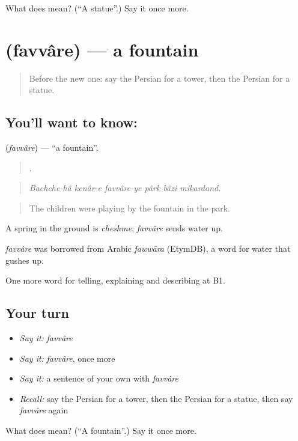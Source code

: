 \begin{tcolorbox}[breakable,colback=teal!4,colframe=teal!35!black,title={Before you move on}]
What does  mean? (\textquotedblleft{}A statue\textquotedblright{}.) Say it once more.
\end{tcolorbox}
\section[\texorpdfstring{\fa{فواره} (favvâre)}{فواره (favvâre)}]{ (favvâre) — a fountain}

\label{lesson:FA-C450-favvare}



\begin{quote}
Before the new one: say the Persian for a tower, then the Persian for a statue.
\end{quote}

\subsection*{You'll want to know: }
\textbf{} (\emph{favvâre}) — \textquotedblleft{}a fountain\textquotedblright{}.

\begin{quote}
      .
\end{quote}

\begin{quote}
\emph{Bachche-hâ kenâr-e favvâre-ye pârk bâzi mikardand.}
\end{quote}

\begin{quote}
The children were playing by the fountain in the park.
\end{quote}

A spring in the ground is \emph{cheshme}; \emph{favvâre} sends water up.

\begin{cousinweb}
\emph{favvâre} was borrowed from Arabic \emph{fawwāra} (EtymDB), a word for water that gushes up.
\end{cousinweb}

\begin{grammarlens}[title={What you've built}]
One more word for telling, explaining and describing at B1.
\end{grammarlens}

\subsection*{Your turn}
\begin{itemize}
\raggedright
  \item \emph{Say it:} \emph{favvâre}
  \item \emph{Say it:} \emph{favvâre}, once more
  \item \emph{Say it:} a sentence of your own with \emph{favvâre}
  \item \emph{Recall:} say the Persian for a tower, then the Persian for a statue, then say \emph{favvâre} again
\end{itemize}

\begin{tcolorbox}[breakable,colback=teal!4,colframe=teal!35!black,title={Before you move on}]
What does  mean? (\textquotedblleft{}A fountain\textquotedblright{}.) Say it once more.
\end{tcolorbox}

